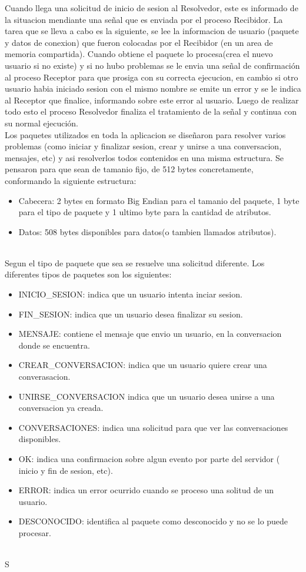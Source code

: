 \documentclass[a4paper,12pt,titlepage]{article}
\begin{document}
Cuando llega una solicitud de inicio de sesion al Resolvedor, este es informado de la situacion mendiante una señal que es enviada por el proceso Recibidor. La tarea que se lleva a cabo es la siguiente, se lee la informacion de usuario (paquete y datos de conexion) que fueron colocadas por el Recibidor (en un area de memoria compartida). Cuando obtiene el paquete lo procesa(crea el nuevo usuario si no existe) y si no hubo problemas se le envia una señal de confirmación al proceso Receptor para que prosiga con su correcta ejecucion, en cambio si otro usuario habia iniciado sesion con el mismo nombre se emite un error y se le indica al Receptor que finalice, informando sobre este error al usuario. Luego de realizar todo esto el proceso Resolvedor finaliza el tratamiento de la señal y continua con su normal ejecución.\\


Los paquetes utilizados en toda la aplicacion se diseñaron para resolver varios problemas (como iniciar y finalizar sesion, crear y unirse a una conversacion, mensajes, etc) y asi resolverlos todos contenidos en una misma estructura.
Se pensaron para que sean de tamanio fijo, de 512 bytes concretamente, conformando la siguiente estructura:

\begin{itemize}
\item Cabecera: 2 bytes en formato Big Endian para el tamanio del paquete, 1 byte para el tipo de paquete y 1 ultimo byte para la cantidad de atributos.
\item Datos: 508 bytes disponibles para datos(o tambien llamados atributos).
\end{itemize}\\

Segun el tipo de paquete que sea se resuelve una solicitud diferente. Los diferentes tipos de paquetes son los siguientes:
\begin{itemize}
\item INICIO\_SESION: indica que un usuario intenta inciar sesion.
\item FIN\_SESION: indica que un usuario desea finalizar su sesion.
\item MENSAJE: contiene el mensaje que envio un usuario, en la conversacion donde se encuentra.
\item CREAR\_CONVERSACION: indica que un usuario quiere crear una converasacion.
\item UNIRSE\_CONVERSACION indica que un usuario desea unirse a una conversacion ya creada.
\item CONVERSACIONES: indica una solicitud para que ver las conversaciones disponibles.
\item OK: indica una confirmacion sobre algun evento por parte del servidor ( inicio y fin de sesion, etc).
\item ERROR: indica un error ocurrido cuando se proceso una solitud de un usuario.
\item DESCONOCIDO: identifica al paquete como desconocido y no se lo puede procesar.

\end{itemize}\\
S
\end{document}
